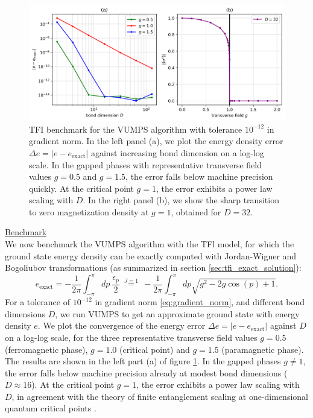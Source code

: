 \begin{figure}[t]
  \centering
  \includegraphics[width=1.0\linewidth]{vumps.png}
  \caption{TFI benchmark for the VUMPS algorithm with tolerance $10^{-12}$ in gradient norm. In the left panel (a), we plot the energy density error $\Delta e = \vert e - e_{\mathrm{exact}} \vert$ against increasing bond dimension on a log-log scale. In the gapped phases with representative transverse field values $g = 0.5$ and $g = 1.5$, the error falls below machine precision quickly. At the critical point $g = 1$, the error exhibits a power law scaling with $D$. In the right panel (b), we show the sharp transition to zero magnetization density at $g= 1$, obtained for $D = 32$.}
 \label{fig:vumps}
\end{figure}
\noindent \underline{Benchmark} \\[0.5em]
\noindent We now benchmark the VUMPS algorithm with the TFl model, for which the ground state energy density can be exactly computed with Jordan-Wigner and Bogoliubov transformations (as summarized in section \ref{sec:tfi_exact_solution}):
\begin{equation}
	e_{\mathrm{exact}} = - \frac{1}{2 \pi} \int_{-\pi}^{\pi} dp \: \frac{\epsilon_p}{2} 
	\:\overset{J=1}{=}\:
	 - \frac{1}{2 \pi} \int_{-\pi}^{\pi} dp \sqrt{g^2 - 2g \cos (p) + 1}.
\end{equation}
For a tolerance of $10^{-12}$ in gradient norm \eqref{eq:gradient_norm}, and different bond dimensions $D$, we run VUMPS to get an approximate ground state with energy density $e$. We plot the convergence of the energy error $\Delta e = \vert e - e_{\mathrm{exact}} \vert$ against $D$ on a log-log scale, for the three representative transverse field values $g = 0.5$ (ferromagnetic phase), $g = 1.0$ (critical point) and $g = 1.5$ (paramagnetic phase). The results are shown in the left part (a) of figure \ref{fig:vumps}. In the gapped phases $g \neq 1$, the error falls below machine precision already at modest bond dimensions ($D \approx 16$). At the critical point $g = 1$, the error exhibits a power law scaling with $D$, in agreement with the theory of finite entanglement scaling at one-dimensional quantum critical points \cite{pollmann2009theory}. \\[0.5em]
